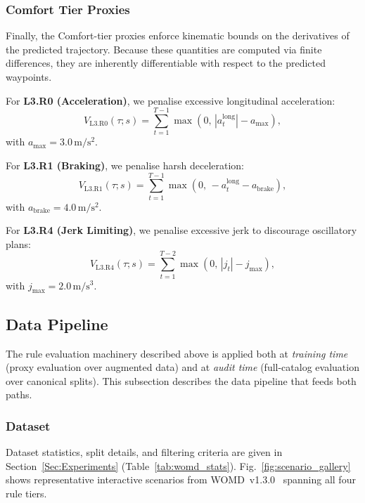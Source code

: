 \subsubsection{Comfort Tier Proxies}

Finally, the Comfort-tier proxies enforce kinematic bounds on the derivatives of the predicted trajectory.  Because these quantities are computed via finite differences, they are inherently differentiable with respect to the predicted waypoints.

For \textbf{L3.R0 (Acceleration)}, we penalise excessive longitudinal acceleration:
\begin{equation}
V_{\text{L3.R0}}(\tau; s)=\sum_{t=1}^{T-1}\max\!\left(0,\,|a_t^{\text{long}}|-a_{\max}\right),
\end{equation}
with $a_{\max}{=}3.0\,\mathrm{m/s^2}$.

For \textbf{L3.R1 (Braking)}, we penalise harsh deceleration:
\begin{equation}
V_{\text{L3.R1}}(\tau; s)=\sum_{t=1}^{T-1}\max\!\left(0,\,-a_t^{\text{long}}-a_{\text{brake}}\right),
\end{equation}
with $a_{\text{brake}}{=}4.0\,\mathrm{m/s^2}$.

For \textbf{L3.R4 (Jerk Limiting)}, we penalise excessive jerk to discourage
oscillatory plans:
\begin{equation}
V_{\text{L3.R4}}(\tau; s)=\sum_{t=1}^{T-2}\max\!\left(0,\,|j_t|-j_{\max}\right),
\end{equation}
with $j_{\max}{=}2.0\,\mathrm{m/s^3}$.

\subsection{Data Pipeline}
\label{subsec:data_pipeline}

The rule evaluation machinery described above is applied both at \emph{training time} (proxy evaluation over augmented data) and at \emph{audit time} (full-catalog evaluation over canonical splits).  This subsection describes the data pipeline that feeds both paths.

\subsubsection{Dataset}

Dataset statistics, split details, and filtering criteria are given in Section~\ref{Sec:Experiments} (Table~\ref{tab:womd_stats}). Fig.~\ref{fig:scenario_gallery} shows representative interactive scenarios from WOMD~v1.3.0~\cite{WOMD_20201} spanning all four rule tiers.

